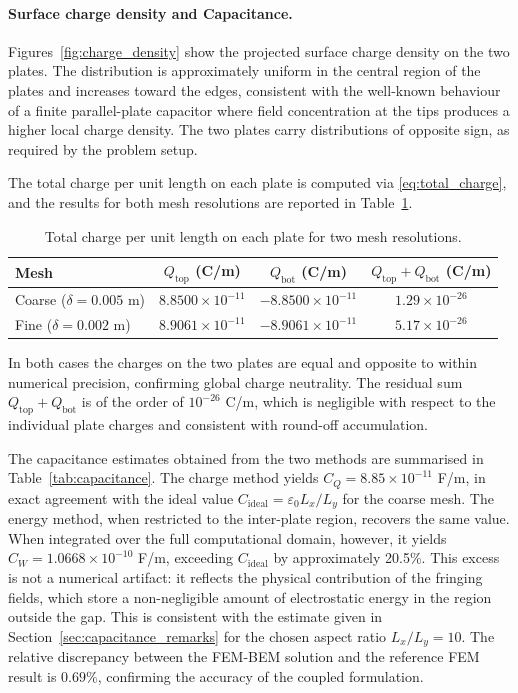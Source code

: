 \documentclass[11pt,onecolumn]{article}
\begin{document}
\paragraph{Surface charge density and Capacitance.}

Figures~\ref{fig:charge_density} show the projected surface charge density 
on the two plates. The distribution is approximately uniform in the central 
region of the plates and increases toward the edges, consistent with the 
well-known behaviour of a finite parallel-plate capacitor where field 
concentration at the tips produces a higher local charge density. The two 
plates carry distributions of opposite sign, as required by the problem setup.

The total charge per unit length on each plate is computed via 
\eqref{eq:total_charge}, and the results for both mesh resolutions are 
reported in Table~\ref{tab:charge}.

\begin{table}[h!]
    \centering
    \begin{tabular}{lccc}
        \hline
        Mesh & $Q_{\text{top}}$ (C/m) & $Q_{\text{bot}}$ (C/m) & 
        $Q_{\text{top}} + Q_{\text{bot}}$ (C/m) \\
        \hline
        Coarse ($\delta = 0.005$ m) & $8.8500 \times 10^{-11}$ & 
        $-8.8500 \times 10^{-11}$ & $1.29\times10^{-26}$ \\
        Fine ($\delta = 0.002$ m)   & $8.9061 \times 10^{-11}$ & 
        $-8.9061 \times 10^{-11}$ & $5.17\times10^{-26}$ \\
        \hline
    \end{tabular}
    \caption{Total charge per unit length on each plate for two mesh 
    resolutions.}
    \label{tab:charge}
\end{table}

In both cases the charges on the two plates are equal and opposite to within 
numerical precision, confirming global charge neutrality. The residual sum 
$Q_{\text{top}} + Q_{\text{bot}}$ is of the order of $10^{-26}$ C/m, which 
is negligible with respect to the individual plate charges and consistent 
with round-off accumulation.

The capacitance estimates obtained from the two methods are summarised in 
Table~\ref{tab:capacitance}. The charge method yields $C_Q = 8.85 \times 
10^{-11}$ F/m, in exact agreement with the ideal value $C_{\text{ideal}} = 
\varepsilon_0 L_x / L_y$ for the coarse mesh. The energy method, when 
restricted to the inter-plate region, recovers the same value. When integrated 
over the full computational domain, however, it yields $C_W = 1.0668 \times 
10^{-10}$ F/m, exceeding $C_{\text{ideal}}$ by approximately 20.5\%. This 
excess is not a numerical artifact: it reflects the physical contribution of 
the fringing fields, which store a non-negligible amount of electrostatic 
energy in the region outside the gap. This is consistent with the estimate 
given in Section~\ref{sec:capacitance_remarks} for the chosen aspect ratio 
$L_x/L_y = 10$. The relative discrepancy between the FEM-BEM solution and 
the reference FEM result is $0.69\%$, confirming the accuracy of the coupled 
formulation.
\end{document}
